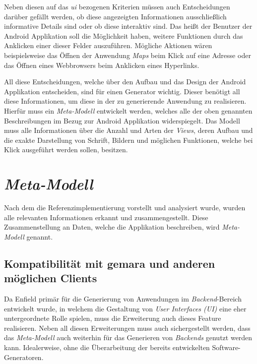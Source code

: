 Neben diesen auf das \textit{\acf{ui}} bezogenen Kriterien müssen auch Entscheidungen darüber gefällt werden, ob diese angezeigten Informationen ausschließlich informative Details sind oder ob diese interaktiv sind. Das heißt der Benutzer der Android Applikation soll die Möglichkeit haben, weitere Funktionen durch das Anklicken einer dieser Felder auszuführen. Mögliche Aktionen wären beispielsweise das Öffnen der Anwendung \textit{Maps} beim Klick auf eine Adresse oder das Öffnen eines Webbrowsers beim Anklicken eines Hyperlinks. 

All diese Entscheidungen, welche über den Aufbau und das Design der Android Applikation entscheiden, sind für einen Generator wichtig. Dieser benötigt all diese Informationen, um diese in der zu generierende Anwendung zu realisieren. Hierfür muss ein \textit{Meta-Modell} entwickelt werden, welches alle der oben genannten Beschreibungen im Bezug zur Android Applikation widerspiegelt. Das Modell muss alle Informationen über die Anzahl und Arten der \textit{Views}, deren Aufbau und die exakte Darstellung von Schrift, Bildern und möglichen Funktionen, welche bei Klick ausgeführt werden sollen, besitzen.

\section{\textit{Meta-Modell}}
Nach dem die Referenzimplementierung vorstellt und analysiert  wurde, wurden alle relevanten Informationen erkannt und zusammengestellt. Diese Zusammenstellung an Daten, welche die Applikation beschreiben, wird \textit{Meta-Modell} genannt.

\subsection{Kompatibilität mit \acs{gemara} und anderen möglichen Clients}
Da Enfield primär für die Generierung von Anwendungen im \textit{Backend}-Bereich entwickelt wurde, in welchem die Gestaltung von \textit{User Interfaces (UI)} eine eher untergeordnete Rolle spielen, muss die Erweiterung auch dieses Feature realisieren. Neben all diesen Erweiterungen muss auch sichergestellt werden, dass das \textit{Meta-Modell} auch weiterhin für das Generieren von \textit{Backends} genutzt werden kann. Idealerweise, ohne die Überarbeitung der bereits entwickelten Software-Generatoren. 

